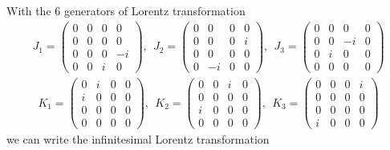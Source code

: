 \documentclass[11pt]{article}
\begin{document}
\section{ }
With the $6$ generators of Lorentz transformation
\begin{eqnarray}
    J_1 = 
    \begin{pmatrix}
      0 & 0 & 0 & 0\\
      0 & 0 & 0 & 0 \\
      0 & 0 & 0 & -i \\
      0 & 0 & i & 0
    \end{pmatrix}
    ,~~ J_2 =
    \begin{pmatrix}
      0 & 0 & 0 & 0 \\
      0 & 0 & 0 & i \\
      0 & 0 & 0 & 0 \\
      0 & -i & 0 & 0 
    \end{pmatrix}
    ,~~J_3=
    \begin{pmatrix}
      0 & 0 & 0 & 0 \\
      0 & 0 & -i & 0 \\
      0 & i & 0 & 0 \\
      0 & 0 & 0 & 0 
    \end{pmatrix}
  \end{eqnarray}
  \begin{eqnarray}
    K_1 =
    \begin{pmatrix}
       0 & i & 0 & 0\\ 
       i & 0 & 0 & 0 \\
       0 & 0 & 0 & 0 \\
       0 & 0 & 0 & 0 
    \end{pmatrix}
    ,~~K_2 =
    \begin{pmatrix}
      0 & 0 & i & 0\\ 
      0 & 0 & 0 & 0 \\
      i & 0 & 0 & 0 \\
      0 & 0 & 0 & 0
    \end{pmatrix}
     ,~~K_3=
     \begin{pmatrix}
      0 & 0 & 0 & i \\
      0 & 0 & 0 & 0 \\
      0 & 0 & 0 & 0 \\
      i & 0 & 0 & 0 
     \end{pmatrix} 
  \end{eqnarray}
we can write the infinitesimal Lorentz transformation
\end{document}
